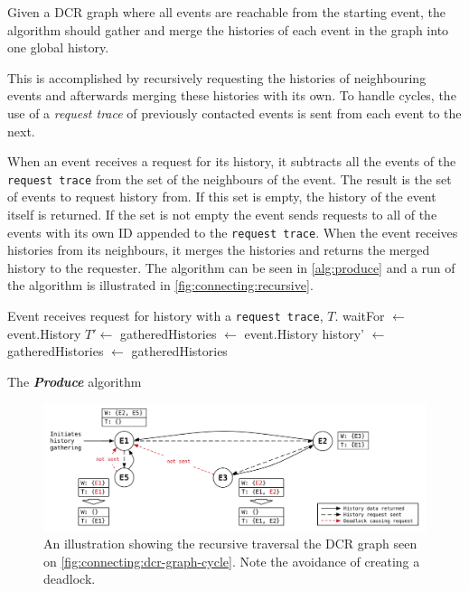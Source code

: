 	\newpar Given a DCR graph where all events are reachable from the starting event, the algorithm should gather and merge the histories of each event in the graph into one global history.
	
	This is accomplished by recursively requesting the histories of neighbouring events and afterwards merging these histories with its own. To handle cycles, the use of a \textit{request trace} of previously contacted events is sent from each event to the next.
	
	\newpar When an event receives a request for its history, it subtracts all the events of the \texttt{request trace} from the set of the neighbours of the event. The result is the set of events to request history from. If this set is empty, the history of the event itself is returned. If the set is not empty the event sends requests to all of the events with its own ID appended to the \texttt{request trace}. When the event receives histories from its neighbours, it merges the histories and returns the merged history to the requester. The algorithm can be seen in \autoref{alg:produce} and a run of the algorithm is illustrated in \autoref{fig:connecting:recursive}.
	
	\begin{algorithm}[H]
		\begin{algorithmic}
			\State Event receives request for history with a \texttt{request trace}, $T$.
			\State
				\State waitFor $\gets$ 
					\Return event.History
				\Else
					\State $T'\gets$
					\State
					\State gatheredHistories $\leftarrow$ event.History
						\State history' $\leftarrow$ 
						\State gatheredHistories $\leftarrow$ 
					\EndFor
					\State\Return gatheredHistories
				\EndIf
			\EndFunction
		\end{algorithmic}
		\caption{The \textit{\textbf{Produce}} algorithm}
		\label{alg:produce}
	\end{algorithm}
	
	\begin{figure}[H]
		\centering
		\includegraphics[width=\textwidth]{4connect/images/recursive.pdf}
		\caption{An illustration showing the recursive traversal the DCR graph seen on \autoref{fig:connecting:dcr-graph-cycle}. Note the avoidance of creating a deadlock.}
		\label{fig:connecting:recursive}
	\end{figure}
	
